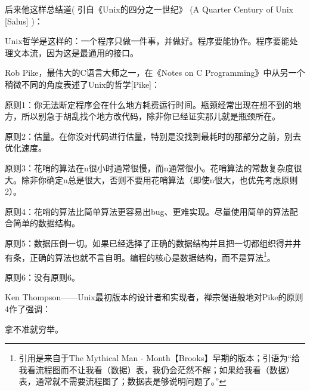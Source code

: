 \documentclass[12pt,oneside]{book}
\begin{document}
\begin{common-format}
后来他这样总结道( 引自《Unix的四分之一世纪》  (A Quarter Century of Unix [Salus]  )：

Unix哲学是这样的：一个程序只做一件事，并做好。程序要能协作。程序要能处理文本流，因为这是最通用的接口。
    
Rob Pike，最伟大的C语言大师之一，在《Notes on C  Programming》中从另一个稍微不同的角度表述了Unix的哲学[Pike]：

原则1：你无法断定程序会在什么地方耗费运行时间。瓶颈经常出现在想不到的地方，所以别急于胡乱找个地方改代码，除非你已经证实那儿就是瓶颈所在。

原则2：估量。在你没对代码进行估量，特别是没找到最耗时的那部分之前，别去优化速度。

原则3：花哨的算法在n很小时通常很慢，而n通常很小。花哨算法的常数复杂度很大。除非你确定n总是很大，否则不要用花哨算法（即使n很大，也优先考虑原则2）。

原则4：花哨的算法比简单算法更容易出bug、更难实现。尽量使用简单的算法配合简单的数据结构。

原则5：数据压倒一切。如果已经选择了正确的数据结构并且把一切都组织得井井有条，正确的算法也就不言自明。编程的核心是数据结构，而不是算法\footnote{引用是来自于The Mythical Man - Month【Brooks】早期的版本；引语为“给我看流程图而不让我看（数据）表，我仍会茫然不解；如果给我看（数据）表，通常就不需要流程图了；数据表是够说明问题了。”}。

原则6：没有原则6。

Ken Thompson——Unix最初版本的设计者和实现者，禅宗偈语般地对Pike的原则4作了强调：

拿不准就穷举。
    

\end{common-format}
\end{document}
